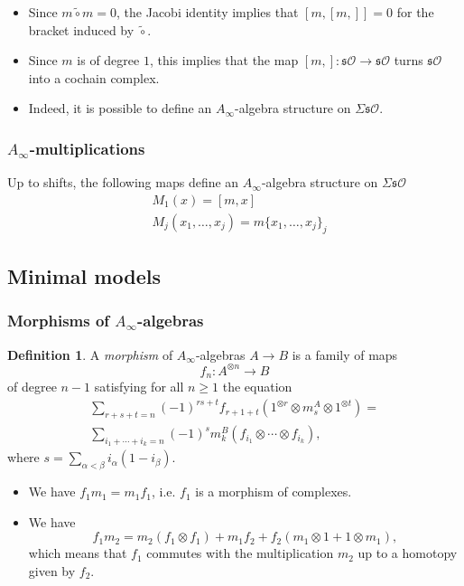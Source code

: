 \documentclass{beamer}
\theoremstyle{definition}
\newtheorem{defi}{Definition}
\begin{document}
\begin{frame}
\begin{itemize}
\item<1-> Since $m\tilde{\circ}m=0$, the Jacobi identity implies that $[m,[m,]]=0$ for the bracket induced by $\tilde{\circ}$.
\item<2-> Since $m$ is of degree $1$, this implies that the map $[m,]:\mathfrak{s}\mathcal{O}\to\mathfrak{s}\mathcal{O}$ turns $\mathfrak{s}\mathcal{O}$ into a cochain complex.
\item<3-> Indeed, it is possible to define an $A_\infty$-algebra structure on $\Sigma\mathfrak{s}\mathcal{O}$. %
\end{itemize}
\end{frame}
\begin{frame}
\frametitle{$A_\infty$-multiplications}
\begin{theorem}[Getzler]
Up to shifts, the following maps define an $A_\infty$-algebra structure on $\Sigma\mathfrak{s}\mathcal{O}$\pause
\begin{align*}
&M_1(x)=[m,x]\\
&M_j(x_1,\dots, x_j)=m\{x_1,\dots, x_j\}_j
\end{align*}
\end{theorem}
\end{frame}
\begin{frame}

\subsection{Minimal models}
\frametitle{Morphisms of $A_\infty$-algebras}
\begin{defi}
A \emph{morphism} of $A_\infty$-algebras $A\to B$ is a family of maps \[f_n:A^{\otimes n}\to B\] of degree $n-1$ satisfying for all $n\geq 1$ the equation
\begin{align*}
\sum_{r+s+t=n} (-1)^{rs+t}f_{r+1+t}(1^{\otimes r} \otimes m^A_s\otimes 1^{\otimes t})=\\
\sum_{i_1+\cdots+i_k=n} (-1)^s m^B_k(f_{i_1}\otimes\cdots\otimes f_{i_k}),
\end{align*}
where
$s=\sum_{\alpha<\beta}i_\alpha(1-i_\beta)$.%
%
\end{defi}

\end{frame}
\begin{frame}
\begin{itemize}
\item<1-> We have $f_1m_1 = m_1f_1$, i.e. $f_1$ is a morphism of complexes.
\item<2-> We have
\[
f_1m_2 = m_2 (f_1\otimes f_1) + m_1f_2 + f_2 (m_1\otimes 1 + 1\otimes m_1),\]
which means that $f_1$ commutes with the multiplication $m_2$ up to a homotopy
given by $f_2$.
\end{itemize}
\end{frame}
\end{document}
